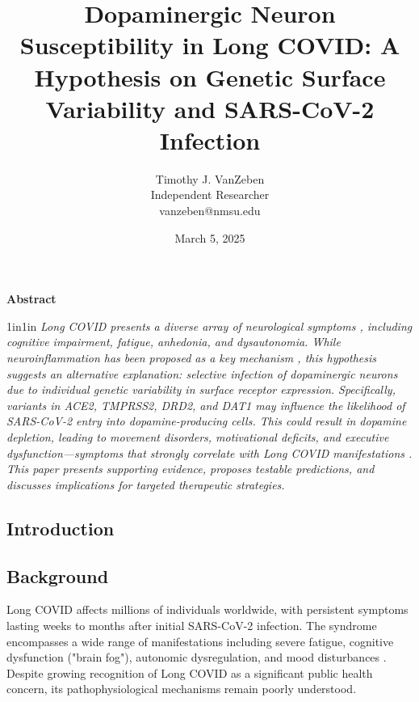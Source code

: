 \documentclass[11pt]{article}
\title{Dopaminergic Neuron Susceptibility in Long COVID: A Hypothesis on Genetic Surface Variability and SARS-CoV-2 Infection}
\author{Timothy J. VanZeben \\ Independent Researcher \\ vanzeben@nmsu.edu}
\date{March 5, 2025}
\begin{document}
\maketitle
\begin{center}
\textbf{Abstract}
\end{center}

\begin{adjustwidth}{1in}{1in}
\small\itshape
Long COVID presents a diverse array of neurological symptoms \citep{taquet2021neuropsychiatric, reiken2022alzheimersignaling}, including cognitive impairment, fatigue, anhedonia, and dysautonomia. While neuroinflammation has been proposed as a key mechanism \citep{crunfli2023astrocytes, yang2021choroidplexus}, this hypothesis suggests an alternative explanation: selective infection of dopaminergic neurons due to individual genetic variability in surface receptor expression. Specifically, variants in ACE2, TMPRSS2, DRD2, and DAT1 may influence the likelihood \citep{novelli2020ace2variants, asselta2020ace2tmprss2} of SARS-CoV-2 entry into dopamine-producing cells. This could result in dopamine depletion, leading to movement disorders, motivational deficits, and executive dysfunction—symptoms that strongly correlate with Long COVID manifestations \citep{davis2021longcovidcohort, graham2021longcovidneuro}. This paper presents supporting evidence, proposes testable predictions, and discusses implications for targeted therapeutic strategies.
\end{adjustwidth}
\begin{center}
\section*{Introduction}
\end{center}

\subsection*{Background}
Long COVID affects millions of individuals worldwide, with persistent symptoms lasting weeks to months after initial SARS-CoV-2 infection. The syndrome encompasses a wide range of manifestations including severe fatigue, cognitive dysfunction ("brain fog"), autonomic dysregulation, and mood disturbances \citep{davis2021longcovidcohort}. Despite growing recognition of Long COVID as a significant public health concern, its pathophysiological mechanisms remain poorly understood.
\end{document}
